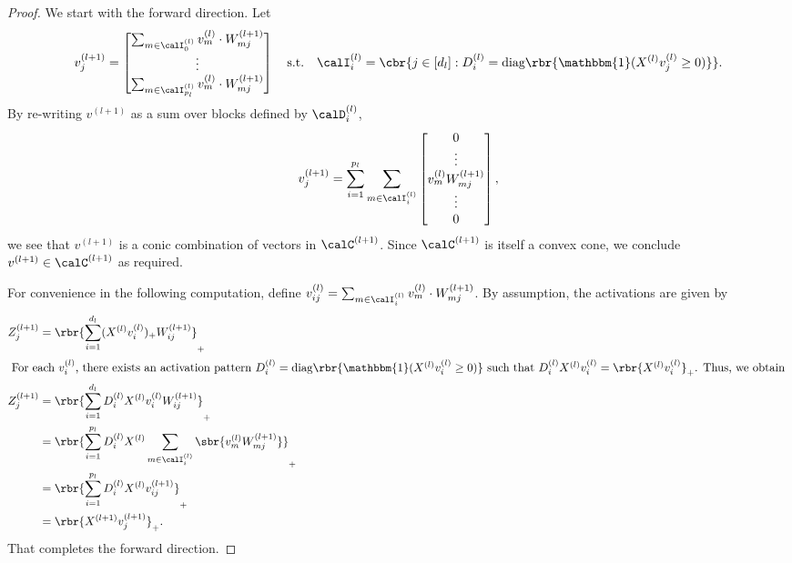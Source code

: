 \documentclass{article}
\newcommand{\Dl}{D^{(l)}}
\newcommand{\calDl}{\calD^{(l)}}
\begin{document}
\begin{proof}
    We start with the forward direction.
    Let
    \begin{equation}
        v^{(l+1)}_{j} =
        \begin{bmatrix}
            \sum_{m \in \calI^{(l)}_0} v^{(l)}_{m} \cdot W_{mj}^{(l+1)} \\
            \vdots                                                      \\
            \sum_{m \in \calI^{(l)}_{p_l}} v^{(l)}_{m} \cdot W_{m j}^{(l+1)}
        \end{bmatrix}
        \quad \text{s.t.} \quad
        \calI^{(l)}_{i} = \cbr{j \in [d_l] :
            \Dl_i = \text{diag}\rbr{\mathbbm{1}(X^{(l)} v^{(l)}_j
                \geq 0)}}.
    \end{equation}
    By re-writing \( v^{(l+1)} \) as a sum over blocks defined by \( \calDl_i \),
    \[
        v^{(l+1)}_{j} = \sum_{i=1}^{p_l}
        \sum_{m \in \calI_i^{(l)}}
        \begin{bmatrix}
            0                        \\
            \vdots                   \\
            v_m^{(l)} W_{mj}^{(l+1)} \\
            \vdots                   \\
            0
        \end{bmatrix},
    \]
    we see that \( v^{(l+1)} \) is a conic combination of vectors in \( \calC^{(l+1)} \).
    Since \( \calC^{(l+1)} \) is itself a convex cone, we conclude
    \( v^{(l+1)} \in \calC^{(l+1)} \) as required.

    For convenience in the following computation, define
    \( v_{ij}^{(l)} = \sum_{m \in \calI^{(l)}_i} v^{(l)}_{m} \cdot W_{mj}^{(l+1)} \).
    By assumption, the activations are given by
    \begin{align*}
        Z_{j}^{(l+1)}
         & = \rbr{\sum_{i = 1}^{d_{l}} (X^{(l)} v^{(l)}_i)_+
        W_{ij}^{(l+1)}}_+                                              \\
        \intertext{
            For each \( v^{(l)}_i \), there exists an
            activation pattern
            \( \Dl_i = \text{diag}\rbr{\mathbbm{1}(X^{(l)} v^{(l)}_i \geq 0)} \)
            such that \( \Dl_i X^{(l)} v^{(l)}_i = \rbr{X^{(l)} v^{(l)}_i}_+ \).
            Thus, we obtain
        }
        Z_{j}^{(l+1)}
         & = \rbr{\sum_{i = 1}^{d_{l}} \Dl_i X^{(l)}
        v^{(l)}_i W_{ij}^{(l+1)}}_+                                    \\
         & = \rbr{\sum_{i = 1}^{p_{l}} \Dl_i X^{(l)}
        \sum_{m \in \calI^{(l)}_{i}} \sbr{v^{(l)}_m W_{mj}^{(l+1)}}}_+ \\
         & = \rbr{\sum_{i = 1}^{p_{l}} \Dl_i X^{(l)} v^{(l+1)}_{ij}}_+ \\
         & = \rbr{X^{(l+1)} v^{(l+1)}_{j}}_+.
    \end{align*}
    That completes the forward direction.


\end{proof}
\end{document}
